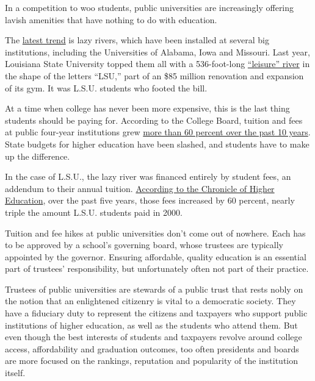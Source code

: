 In a competition to woo students, public universities are increasingly
offering lavish amenities that have nothing to do with education.

The
\href{https://www.nytimes.com/2014/09/21/fashion/college-recreation-now-includes-pool-parties-and-river-rides.html}{latest
trend} is lazy rivers, which have been installed at several big
institutions, including the Universities of Alabama, Iowa and Missouri.
Last year, Louisiana State University topped them all with a
536-foot-long
\href{https://www.chronicle.com/article/The-Lure-of-the-Lazy-River/241434}{``leisure''
river} in the shape of the letters ``LSU,'' part of an \$85 million
renovation and expansion of its gym. It was L.S.U. students who footed
the bill.

At a time when college has never been more expensive, this is the last
thing students should be paying for. According to the College Board,
tuition and fees at public four-year institutions grew
\href{https://trends.collegeboard.org/college-pricing/figures-tables/published-prices-national}{more
than 60 percent over the past 10 years}. State budgets for higher
education have been slashed, and students have to make up the
difference.

In the case of L.S.U., the lazy river was financed entirely by student
fees, an addendum to their annual tuition.
\href{https://www.chronicle.com/article/The-Lure-of-the-Lazy-River/241434}{According
to the Chronicle of Higher Education}, over the past five years, those
fees increased by 60 percent, nearly triple the amount L.S.U. students
paid in 2000.

Tuition and fee hikes at public universities don't come out of nowhere.
Each has to be approved by a school's governing board, whose trustees
are typically appointed by the governor. Ensuring affordable, quality
education is an essential part of trustees' responsibility, but
unfortunately often not part of their practice.

Trustees of public universities are stewards of a public trust that
rests nobly on the notion that an enlightened citizenry is vital to a
democratic society. They have a fiduciary duty to represent the citizens
and taxpayers who support public institutions of higher education, as
well as the students who attend them. But even though the best interests
of students and taxpayers revolve around college access, affordability
and graduation outcomes, too often presidents and boards are more
focused on the rankings, reputation and popularity of the institution
itself.

